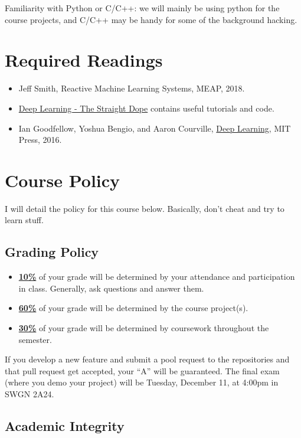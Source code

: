 \documentclass[11pt]{article}
\begin{document}
Familiarity with Python or C/C++: we will mainly be using python for the course projects, and C/C++ may be handy for some of the background hacking.


\section*{Required Readings}

\begin{itemize}
\item Jeff Smith, Reactive Machine Learning Systems, MEAP, 2018.
\item \href{https://gluon.mxnet.io/}{Deep Learning - The Straight Dope} contains useful tutorials and code.
\item Ian Goodfellow, Yoshua Bengio, and Aaron Courville, \href{http://www.deeplearningbook.org/}{Deep Learning}, MIT Press, 2016.
\end{itemize} 


\section*{Course Policy}

I will detail the policy for this course below. Basically, don't cheat and try to learn stuff.

\subsection*{Grading Policy}
\begin{itemize}
  \item \underline{\textbf{10\%}} of your grade will be determined by your attendance and participation in class. Generally, ask questions and answer them.

  \item \underline{\textbf{60\%}} of your grade will be determined by the course project(s). 

  \item \underline{\textbf{30\%}} of your grade will be determined by coursework throughout the semester.

\end{itemize}

If you develop a new feature and submit a pool request to the repositories and that pull request get accepted, your ``A'' will be guaranteed. The final exam (where you demo your project) will be Tuesday, December 11, at 4:00pm in SWGN 2A24.


\subsection*{Academic Integrity}
\end{document}
